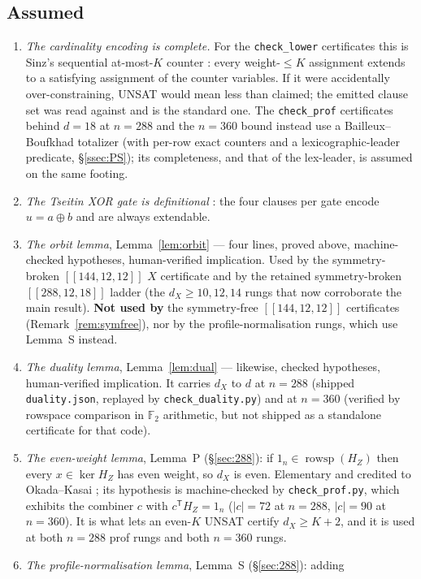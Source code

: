 \documentclass[11pt]{amsart}
\newcommand{\FF}{\mathbb{F}_{2}}
\newcommand{\rowsp}{\operatorname{rowsp}}
\newcommand{\HZ}{H_{Z}}
\newcommand{\dX}{d_{X}}
\newcommand{\gross}{[[144,12,12]]}
\theoremstyle{plain}
\theoremstyle{definition}
\theoremstyle{remark}
\begin{document}
\subsection{Assumed}
\begin{enumerate}
\item \emph{The cardinality encoding is complete.} For the \texttt{check\_lower}
certificates this is Sinz's sequential at-most-$K$ counter \cite{Sinz05}: every
weight-$\le K$ assignment extends to a satisfying assignment of the counter
variables. If it were accidentally over-constraining, UNSAT would mean less than
claimed; the emitted clause set was read against \cite{Sinz05} and is the
standard one. The \texttt{check\_prof} certificates behind $d=18$ at $n=288$ and
the $n=360$ bound instead use a Bailleux--Boufkhad totalizer (with per-row exact
counters and a lexicographic-leader predicate, \S\ref{ssec:PS}); its
completeness, and that of the lex-leader, is assumed on the same footing.
\item \emph{The Tseitin XOR gate is definitional} \cite{Tseitin68}: the four
clauses per gate encode $u=a\oplus b$ and are always extendable.
\item \emph{The orbit lemma}, Lemma~\ref{lem:orbit} --- four lines, proved
above, machine-checked hypotheses, human-verified implication. Used by the
symmetry-broken $\gross$ $X$ certificate and by the retained symmetry-broken
$[[288,12,18]]$ ladder (the $\dX\ge10,12,14$ rungs that now corroborate the
main result). \textbf{Not used by} the symmetry-free $\gross$ certificates
(Remark~\ref{rem:symfree}), nor by the profile-normalisation rungs, which use
Lemma~S instead.
\item \emph{The duality lemma}, Lemma~\ref{lem:dual} --- likewise, checked
hypotheses, human-verified implication. It carries $\dX$ to $d$ at $n=288$
(shipped \texttt{duality.json}, replayed by \texttt{check\_duality.py}) and at
$n=360$ (verified by rowspace comparison in $\FF$ arithmetic, but not shipped as
a standalone certificate for that code).
\item \emph{The even-weight lemma}, Lemma~P (\S\ref{sec:288}): if
$1_n\in\rowsp(\HZ)$ then every $x\in\ker\HZ$ has even weight, so $\dX$ is even.
Elementary and credited to Okada--Kasai \cite{OkadaKasai}; its hypothesis is
machine-checked by \texttt{check\_prof.py}, which exhibits the combiner $c$ with
$c^{\mathsf T}\HZ=1_n$ ($|c|=72$ at $n=288$, $|c|=90$ at $n=360$). It is what
lets an even-$K$ UNSAT certify $\dX\ge K+2$, and it is used at both $n=288$
prof rungs and both $n=360$ rungs.
\item \emph{The profile-normalisation lemma}, Lemma~S (\S\ref{sec:288}): adding

\end{enumerate}
\end{document}
